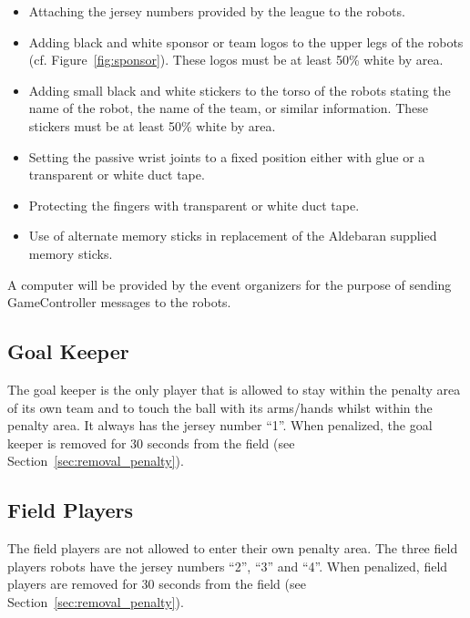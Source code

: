 \documentclass[12pt]{article}
\newcommand{\cf}{\mbox{cf.}\xspace}
\begin{document}
\begin{itemize}

\item Attaching the jersey numbers provided by the league to the robots.

\item Adding black and white sponsor or team logos to the upper legs of the robots (\cf Figure~\ref{fig:sponsor}). These logos must be at least 50\% white by area.

\item Adding small black and white stickers to the torso of the robots stating the name of the robot, the name of the team, or similar information. These stickers must be at least 50\% white by area.

\item Setting the passive wrist joints to a fixed position either with glue or a transparent or white duct tape.

\item Protecting the fingers with transparent or white duct tape.

\item Use of alternate memory sticks in replacement of the Aldebaran supplied memory sticks.

\end{itemize}

A computer will be provided by the event organizers for the purpose of sending GameController messages to the robots.

\subsection{Goal Keeper}
\label{sec:goal_keeper}

The goal keeper is the only player that is allowed to stay within the penalty area of its own team and to touch the ball with its arms/hands whilst within the penalty area. It always has the jersey number ``1''. When penalized, the goal keeper is removed for 30 seconds from the field (see Section~\ref{sec:removal_penalty}).

\subsection{Field Players}
\label{sec:field_players}

The field players are not allowed to enter their own penalty area. The three field players robots have the jersey numbers ``2'', ``3'' and ``4''. When penalized, field players are removed for 30 seconds from the field (see Section~\ref{sec:removal_penalty}).
\end{document}
